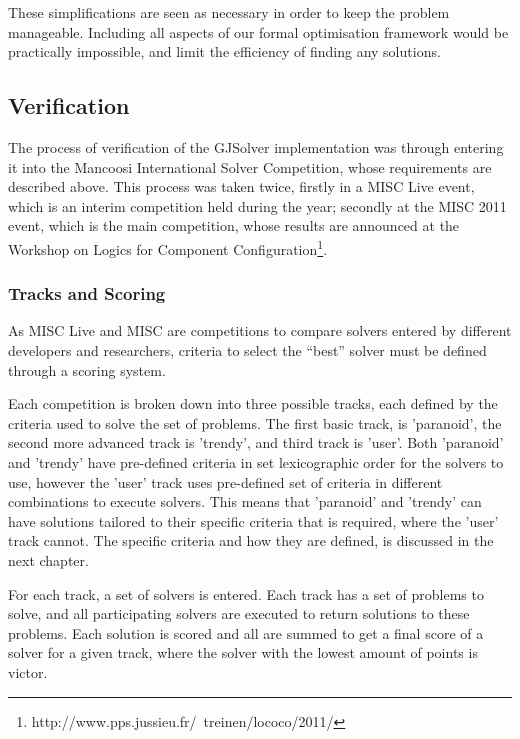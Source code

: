 These simplifications are seen as necessary in order to keep the problem manageable.
Including all aspects of our formal optimisation framework would be practically impossible, and limit the efficiency of finding any solutions.

\subsection{Verification}
The process of verification of the GJSolver implementation was through entering it into the Mancoosi International Solver Competition, whose requirements are described above.
This process was taken twice, firstly in a MISC Live event, which is an interim competition held during the year;
secondly at the MISC 2011 event, 
which is the main competition, whose results are announced at the Workshop on Logics for Component Configuration\footnote{http://www.pps.jussieu.fr/~treinen/lococo/2011/}.

\subsubsection{Tracks and Scoring}
As MISC Live and MISC are competitions to compare solvers entered by different developers and researchers,
criteria to select the ``best'' solver must be defined through a scoring system.

Each competition is broken down into three possible tracks, each defined by the criteria used to solve the set of problems.
The first basic track, is 'paranoid', the second more advanced track is 'trendy', and third track is 'user'.
Both 'paranoid' and 'trendy' have pre-defined criteria in set lexicographic order for the solvers to use, 
however the 'user' track uses pre-defined set of criteria in different combinations to execute solvers.
This means that 'paranoid' and 'trendy' can have solutions tailored to their specific criteria that is required, where the 'user' track cannot.
The specific criteria and how they are defined, is discussed in the next chapter.

For each track, a set of solvers is entered.
Each track has a set of problems to solve, and all participating solvers are executed to return solutions to these problems.
Each solution is scored and all are summed to get a final score of a solver for a given track, where the solver with the lowest amount of points is victor.

